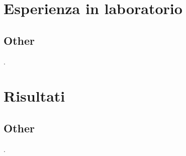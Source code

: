 \documentclass[a4paper]{article}
\begin{document}
	\section{Esperienza in laboratorio}
		\subsection{Other}
			.
	\section{Risultati}
		\subsection{Other}
			.
\end{document}
